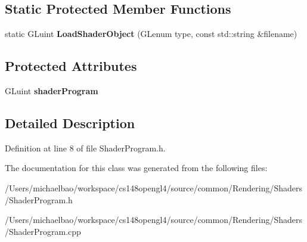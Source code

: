\subsection*{Static Protected Member Functions}
\begin{DoxyCompactItemize}
\item 
\hypertarget{class_shader_program_ab5c50c33203cf65b7f6ffe00d2243d5a}{}static G\+Luint {\bfseries Load\+Shader\+Object} (G\+Lenum type, const std\+::string \&filename)\label{class_shader_program_ab5c50c33203cf65b7f6ffe00d2243d5a}

\end{DoxyCompactItemize}
\subsection*{Protected Attributes}
\begin{DoxyCompactItemize}
\item 
\hypertarget{class_shader_program_a7d8f2b643a81ac4097606e43ade92f81}{}G\+Luint {\bfseries shader\+Program}\label{class_shader_program_a7d8f2b643a81ac4097606e43ade92f81}

\end{DoxyCompactItemize}


\subsection{Detailed Description}


Definition at line 8 of file Shader\+Program.\+h.



The documentation for this class was generated from the following files\+:\begin{DoxyCompactItemize}
\item 
/\+Users/michaelbao/workspace/cs148opengl4/source/common/\+Rendering/\+Shaders/Shader\+Program.\+h\item 
/\+Users/michaelbao/workspace/cs148opengl4/source/common/\+Rendering/\+Shaders/Shader\+Program.\+cpp\end{DoxyCompactItemize}
